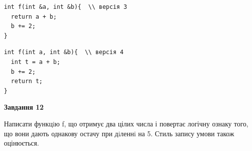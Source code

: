 \documentclass[12pt, ukrainian]{article}
\begin{document}
{\begin {large}
\begin{minipage}[t]{11.0cm}
\vspace{-8mm}\begin{verbatim}
int f(int &a, int &b){  \\ версія 3
  return a + b;
  b += 2;
}
\end{verbatim}

\vspace{-8mm}\begin{verbatim}
int f(int a, int &b){  \\ версія 4
  int t = a + b;
  b += 2;
  return t;
}
\end{verbatim}



\begin{center}
\textbf{Завдання 12}
\end{center}

Написати функцiю f, що отримує два цілих числа і повертає логічну ознаку того, що вони дають однакову остачу при дiленнi на 5. Стиль запису умови також оцінюється.\par

\end{minipage}

\end {large}}
\newpage
\end{document}
